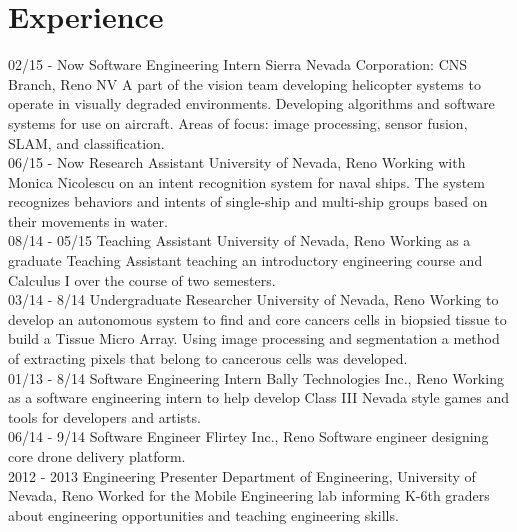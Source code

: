 \documentclass[]{friggeri-cv}
\begin{document}
\section{Experience}
\begin{entrylist}
  \entry
    {02/15 - Now}
    {Software Engineering Intern}
    {Sierra Nevada Corporation: CNS Branch, Reno NV}
    {A part of the vision team developing helicopter systems to operate in visually degraded environments. Developing algorithms and software systems for use on aircraft. Areas of focus: image processing, sensor fusion, SLAM, and classification.\\}
  \entry
    {06/15 - Now}
    {Research Assistant}
    {University of Nevada, Reno}
    {Working with Monica Nicolescu on an intent recognition system for naval ships. The system recognizes behaviors and intents of single-ship and multi-ship groups based on their movements in water.\\}
  \entry
    {08/14 - 05/15}
    {Teaching Assistant}
    {University of Nevada, Reno}
    {Working as a graduate Teaching Assistant teaching an introductory engineering course and Calculus I over the course of two semesters.\\}
  \entry
    {03/14 - 8/14}
    {Undergraduate Researcher}
    {University of Nevada, Reno}
    {Working to develop an autonomous system to find and core cancers cells in biopsied tissue to build a Tissue Micro Array. Using image processing and segmentation a method of extracting pixels that belong to cancerous cells was developed.\\}
    \entry
    {01/13 - 8/14}
    {Software Engineering Intern}
    {Bally Technologies Inc., Reno}
    {Working as a software engineering intern to help develop Class III Nevada style games and tools for developers and artists.\\}
    \entry
    {06/14 - 9/14}
    {Software Engineer}
    {Flirtey Inc., Reno}
    {Software engineer designing core drone delivery platform.\\}
    \entry
    {2012 - 2013}
    {Engineering Presenter}
    {Department of Engineering, University of Nevada, Reno}
    {Worked for the Mobile Engineering lab informing K-6th graders about engineering opportunities and teaching engineering skills.}
\end{entrylist}
\end{document}
